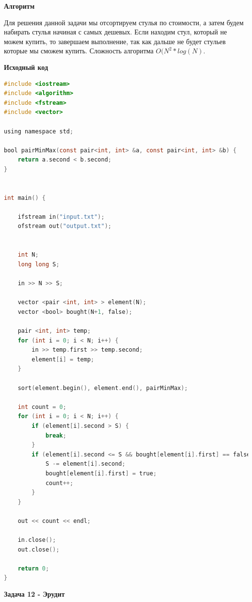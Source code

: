 \documentclass[a4paper,12pt]{article}
\begin{document}
\textbf{{\large Алгоритм}}

Для решения данной задачи мы отсортируем стулья по стоимости, а затем будем набирать стулья начиная с самых дешевых. Если находим стул, который не можем купить, то завершаем выполнение, так как дальше не будет стульев которые мы сможем купить. Сложность алгоритма $O(N^2 * log(N)$.

\newpage
\textbf{{\large Исходный код}} \\
\begin{lstlisting}[language=C]
#include <iostream>
#include <algorithm>
#include <fstream>
#include <vector>

using namespace std;

bool pairMinMax(const pair<int, int> &a, const pair<int, int> &b) {
	return a.second < b.second;
}


int main() {

	ifstream in("input.txt");
	ofstream out("output.txt");


	int N;
	long long S;

	in >> N >> S;

	vector <pair <int, int> > element(N);
	vector <bool> bought(N+1, false);

	pair <int, int> temp;
	for (int i = 0; i < N; i++) {
		in >> temp.first >> temp.second;
		element[i] = temp;
	}

	sort(element.begin(), element.end(), pairMinMax);

	int count = 0;
	for (int i = 0; i < N; i++) {
		if (element[i].second > S) {
			break;
		}
		if (element[i].second <= S && bought[element[i].first] == false) {
			S -= element[i].second;
			bought[element[i].first] = true;
			count++;
		}
	}

	out << count << endl;
	
	in.close();
	out.close();

	return 0;
}
\end{lstlisting}


\newpage
\textbf{{\large Задача 12 - Эрудит}}
\end{document}
